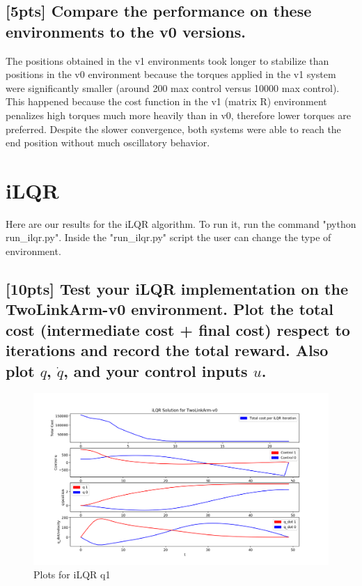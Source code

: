 \documentclass{article}
\begin{document}
\subsection{[5pts] Compare the performance on these environments to the v0 versions.}

The positions obtained in the v1 environments took longer to stabilize than positions in the v0 environment because the torques applied in the v1 system were significantly smaller (around 200 max control versus 10000 max control). This happened because the cost function in the v1 (matrix R) environment penalizes high torques much more heavily than in v0, therefore lower torques are preferred. Despite the slower convergence, both systems were able to reach the end position without much oscillatory behavior.





\section{iLQR}
Here are our results for the iLQR algorithm. To run it, run the command "python run\_ilqr.py". Inside the "run\_ilqr.py" script the user can change the type of environment.

\subsection{[10pts] Test your iLQR implementation on the TwoLinkArm-v0 environment. Plot the total cost (intermediate cost + final cost) respect to iterations and record the total reward. Also plot $q$, $\dot{q}$, and your control inputs $u$.}

\begin{figure}[H] \label{fig:ilqr_qn1}
  \centering
  \includegraphics[width=1.2\textwidth]{images/ilqr_qn1}
  \caption{Plots for iLQR q1}
\end{figure}
\end{document}
